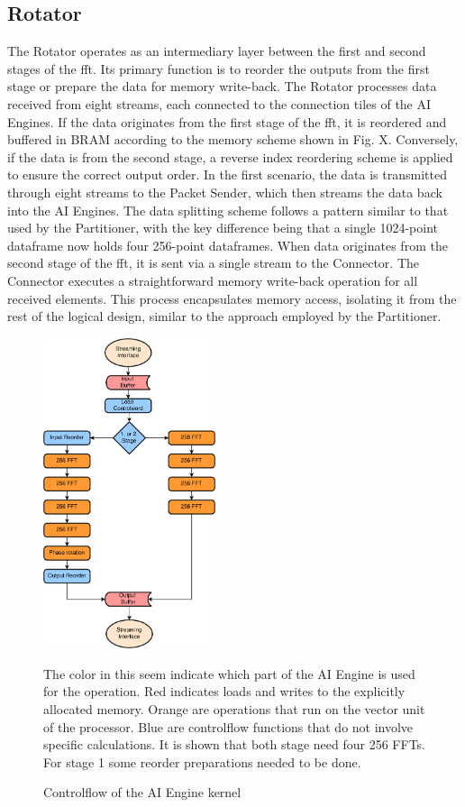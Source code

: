 \subsection{Rotator}
The Rotator operates as an intermediary layer between the first and second stages of the \ac{fft}. Its primary function is to reorder the outputs from the first stage or prepare the data for memory write-back. The Rotator processes data received from eight streams, each connected to the connection tiles of the AI Engines. If the data originates from the first stage of the \ac{fft}, it is reordered and buffered in BRAM according to the memory scheme shown in Fig. X. Conversely, if the data is from the second stage, a reverse index reordering scheme is applied to ensure the correct output order. In the first scenario, the data is transmitted through eight streams to the Packet Sender, which then streams the data back into the AI Engines. The data splitting scheme follows a pattern similar to that used by the Partitioner, with the key difference being that a single 1024-point dataframe now holds four 256-point dataframes. When data originates from the second stage of the \ac{fft}, it is sent via a single stream to the Connector. The Connector executes a straightforward memory write-back operation for all received elements. This process encapsulates memory access, isolating it from the rest of the logical design, similar to the approach employed by the Partitioner.

\begin{figure}[h!]
    \centering
    \includegraphics[width=0.45\textwidth]{images/flex_kernel.png}
    \captionsetup{justification=centering}
    \caption{Controlflow of the AI Engine kernel}
        The color in this seem indicate which part of the AI Engine is used for the operation. Red indicates loads and writes to the explicitly allocated memory. Orange are operations that run on the vector unit of the processor. Blue are controlflow functions that do not involve specific calculations. It is shown that both stage need four 256 FFTs. For stage 1 some reorder preparations needed to be done.
    \label{fig:flex_kernel}
\end{figure}

